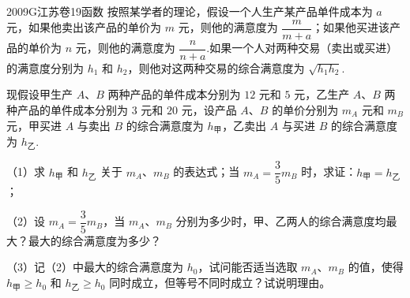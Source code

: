 
\begin{problem}{2009}{G}{江苏卷}{19}{函数}
按照某学者的理论，假设一个人生产某产品单件成本为 $ a $ 元，如果他卖出该产品的单价为 $ m $ 元，则他的满意度为 $ \dfrac{m}{m+a} $；如果他买进该产品的单价为 $ n $ 元，则他的满意度为 $ \dfrac{n}{n+a} $.如果一个人对两种交易（卖出或买进）的满意度分别为 $ h_1 $ 和 $ h_2 $，则他对这两种交易的综合满意度为 $ \sqrt{h_1 h_2} $.

现假设甲生产 $ A $、$ B $ 两种产品的单件成本分别为 $ 12 $ 元和 $ 5 $ 元，乙生产 $ A $、$ B $ 两种产品的单件成本分别为 $ 3 $ 元和 $ 20 $ 元，设产品 $ A $、$ B $ 的单价分别为 $ m_A $ 元和 $ m_B $ 元，甲买进 $ A $ 与卖出 $ B $ 的综合满意度为 $ h_{\text{甲}} $，乙卖出 $ A $ 与买进 $ B $ 的综合满意度为 $ h_{\text{乙}} $.

（1）求 $ h_{\text{甲}} $ 和 $ h_{\text{乙}} $ 关于 $ m_A $、$ m_B $ 的表达式；当 $ m_A = \dfrac{3}{5} m_B $ 时，求证：$ h_{\text{甲}} = h_{\text{乙}} $；

（2）设 $ m_A = \dfrac{3}{5} m_B $，当 $ m_A $、$ m_B $ 分别为多少时，甲、乙两人的综合满意度均最大？最大的综合满意度为多少？

（3）记（2）中最大的综合满意度为 $ h_0 $，试问能否适当选取 $ m_A $、$ m_B $ 的值，使得 $ h_{\text{甲}} \geqslant h_0 $ 和 $ h_{\text{乙}} \geqslant h_0 $ 同时成立，但等号不同时成立？试说明理由。
\end{problem}

\begin{answer}

\end{answer}

\begin{solutions}

\end{solutions}